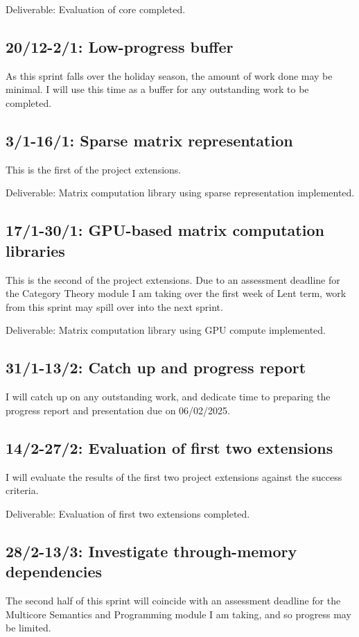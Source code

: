 \documentclass[a4paper,12pt]{article}
\begin{document}
\medskip\noindent Deliverable: Evaluation of core completed.

\subsection*{20/12-2/1: Low-progress buffer}
As this sprint falls over the holiday season, the amount of work done may be minimal.
I will use this time as a buffer for any outstanding work to be completed.

\subsection*{3/1-16/1: Sparse matrix representation}
This is the first of the project extensions.

\medskip\noindent Deliverable: Matrix computation library using sparse representation implemented.

\subsection*{17/1-30/1: GPU-based matrix computation libraries}
This is the second of the project extensions.
Due to an assessment deadline for the Category Theory module I am taking over the first
week of Lent term, work from this sprint may spill over into the next sprint.

\medskip\noindent Deliverable: Matrix computation library using GPU compute implemented.

\subsection*{31/1-13/2: Catch up and progress report}
I will catch up on any outstanding work, and dedicate time to preparing the progress
report and presentation due on 06/02/2025.

\subsection*{14/2-27/2: Evaluation of first two extensions}
I will evaluate the results of the first two project extensions against the success criteria.

\medskip\noindent Deliverable: Evaluation of first two extensions completed.

\subsection*{28/2-13/3: Investigate through-memory dependencies}
The second half of this sprint will coincide with an assessment deadline for the Multicore
Semantics and Programming module I am taking, and so progress may be limited.
\end{document}
